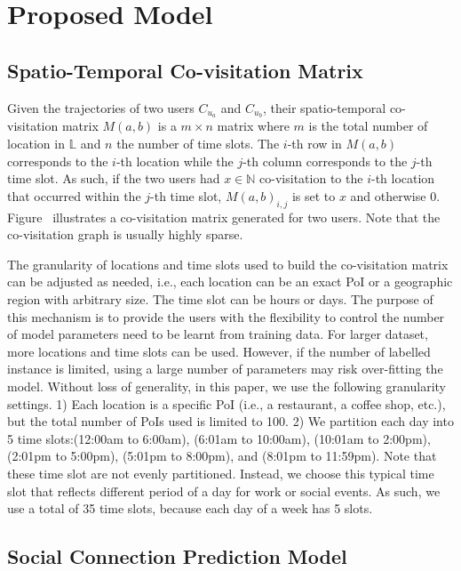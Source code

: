 \section{Proposed Model} \label{sec:model}

\subsection{Spatio-Temporal Co-visitation Matrix}

Given the trajectories of two users $C_{u_a}$ and $C_{u_b}$, their spatio-temporal co-visitation matrix $M(a,b)$ is a $m \times n$ matrix where $m$ is the total number of location in $\mathbb{L}$ and $n$ the number of time slots. The $i$-th row in $M(a,b)$ corresponds to the $i$-th location while the $j$-th column corresponds to the $j$-th time slot. As such, if the two users had $x \in \mathbb{N}$ co-visitation to the $i$-th location that occurred within the $j$-th time slot, $M(a,b)_{i,j}$ is set to $x$ and otherwise 0. Figure~ illustrates a co-visitation matrix generated for two users. Note that the co-visitation graph is usually highly sparse.

The granularity of locations and time slots used to build the co-visitation matrix can be adjusted as needed, i.e., each location can be an exact PoI or a geographic region with arbitrary size. The time slot can be hours or days. The purpose of this mechanism is to provide the users with the flexibility to control the number of model parameters need to be learnt from training data. For larger dataset, more locations and time slots can be used. However, if the number of labelled instance is limited, using a large number of parameters may risk over-fitting the model. Without loss of generality, in this paper, we use the following granularity settings. 1) Each location is a specific PoI (i.e., a restaurant, a coffee shop, etc.), but the total number of PoIs used is limited to 100. 2) We partition each day into 5 time slots:(12:00am to 6:00am), (6:01am to 10:00am), (10:01am to 2:00pm), (2:01pm to 5:00pm), (5:01pm to 8:00pm), and (8:01pm to 11:59pm). Note that these time slot are not evenly partitioned. Instead, we choose this typical time slot that reflects different period of a day for work or social events. As such, we use a total of 35 time slots, because each day of a week has 5 slots.

\subsection{Social Connection Prediction Model}


